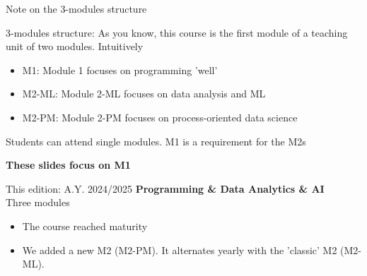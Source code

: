 \documentclass{beamer}%
\begin{document}
\begin{frame}{Note on the 3-modules structure}
	\begin{block}{3-modules structure: %
		}
		As you know, this course is the first module of a teaching unit of two modules. Intuitively
		\begin{itemize}
			\item M1: Module 1 focuses on programming 'well'
			\item M2-ML: Module 2-ML focuses  on data analysis and ML
			\item M2-PM: Module 2-PM focuses on process-oriented data science
		\end{itemize}
		Students can attend single modules. M1 is a requirement for the M2s
		\vspace{-0.4cm}
		\begin{center}\textbf{These slides focus on M1}\end{center}
	\end{block}	
	\begin{block}{This edition: A.Y. 2024/2025}
		\textbf{Programming \& Data Analytics \& AI}\\ Three modules
		\begin{itemize}
			\item The course reached maturity
			\item We added a new M2 (M2-PM). It alternates yearly with the 'classic' M2 (M2-ML). 
		\end{itemize}
	\end{block}
\end{frame}
\end{document}
